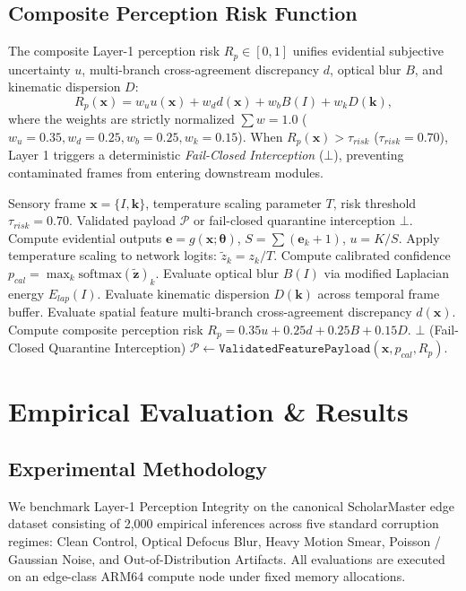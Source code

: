 \documentclass[conference]{IEEEtran}
\begin{document}
\subsection{Composite Perception Risk Function}
The composite Layer-1 perception risk $R_p \in [0, 1]$ unifies evidential subjective uncertainty $u$, multi-branch cross-agreement discrepancy $d$, optical blur $B$, and kinematic dispersion $D$:
\begin{equation}
R_p(\mathbf{x}) = w_u u(\mathbf{x}) + w_d d(\mathbf{x}) + w_b B(I) + w_k D(\mathbf{k}),
\end{equation}
where the weights are strictly normalized $\sum w = 1.0$ ($w_u=0.35, w_d=0.25, w_b=0.25, w_k=0.15$). When $R_p(\mathbf{x}) > \tau_{risk}$ ($\tau_{risk}=0.70$), Layer 1 triggers a deterministic \textit{Fail-Closed Interception} ($\bot$), preventing contaminated frames from entering downstream modules.

\begin{algorithm}[t]
\caption{Layer-1 Perception Integrity Gating \& Temperature Calibration}
\label{alg:perception_gate}
\begin{algorithmic}[1]
\REQUIRE Sensory frame $\mathbf{x} = \{I, \mathbf{k}\}$, temperature scaling parameter $T$, risk threshold $\tau_{risk} = 0.70$.
\ENSURE Validated payload $\mathcal{P}$ or fail-closed quarantine interception $\bot$.
\STATE Compute evidential outputs $\mathbf{e} = g(\mathbf{x}; \boldsymbol{\theta})$, $S = \sum (\mathbf{e}_k + 1)$, $u = K/S$.
\STATE Apply temperature scaling to network logits: $\tilde{z}_k = z_k / T$.
\STATE Compute calibrated confidence $p_{cal} = \max_k \mathrm{softmax}(\tilde{\mathbf{z}})_k$.
\STATE Evaluate optical blur $B(I)$ via modified Laplacian energy $E_{lap}(I)$.
\STATE Evaluate kinematic dispersion $D(\mathbf{k})$ across temporal frame buffer.
\STATE Evaluate spatial feature multi-branch cross-agreement discrepancy $d(\mathbf{x})$.
\STATE Compute composite perception risk $R_p = 0.35 u + 0.25 d + 0.25 B + 0.15 D$.
    \RETURN $\bot$ (Fail-Closed Quarantine Interception)
\ELSE
    \RETURN $\mathcal{P} \leftarrow \mathtt{ValidatedFeaturePayload}(\mathbf{x}, p_{cal}, R_p)$.
\ENDIF
\end{algorithmic}
\end{algorithm}

\section{Empirical Evaluation \& Results}
\subsection{Experimental Methodology}
We benchmark Layer-1 Perception Integrity on the canonical ScholarMaster edge dataset consisting of 2,000 empirical inferences across five standard corruption regimes: Clean Control, Optical Defocus Blur, Heavy Motion Smear, Poisson / Gaussian Noise, and Out-of-Distribution Artifacts. All evaluations are executed on an edge-class ARM64 compute node under fixed memory allocations.
\end{document}
